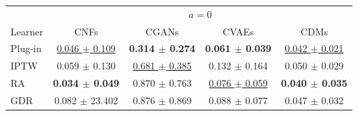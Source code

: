 \begin{tabu}{l|cccc}
\toprule
 &  \\
Learner & CNFs & CGANs & CVAEs & CDMs \\
\midrule
Plug-in & \underline{0.046 $\pm$ 0.109} & \textbf{0.314 $\pm$ 0.274} & \textbf{0.061 $\pm$ 0.039} & \underline{0.042 $\pm$ 0.021} \\
IPTW & 0.059 $\pm$ 0.130 & \underline{0.681 $\pm$ 0.385} & 0.132 $\pm$ 0.164 & 0.050 $\pm$ 0.029 \\
RA & \textbf{0.034 $\pm$ 0.049} & 0.870 $\pm$ 0.763 & \underline{0.076 $\pm$ 0.059} & \textbf{0.040 $\pm$ 0.035} \\
GDR & 0.082 $\pm$ 23.402 & 0.876 $\pm$ 0.869 & 0.088 $\pm$ 0.077 & 0.047 $\pm$ 0.032 \\
\bottomrule
\end{tabu}


